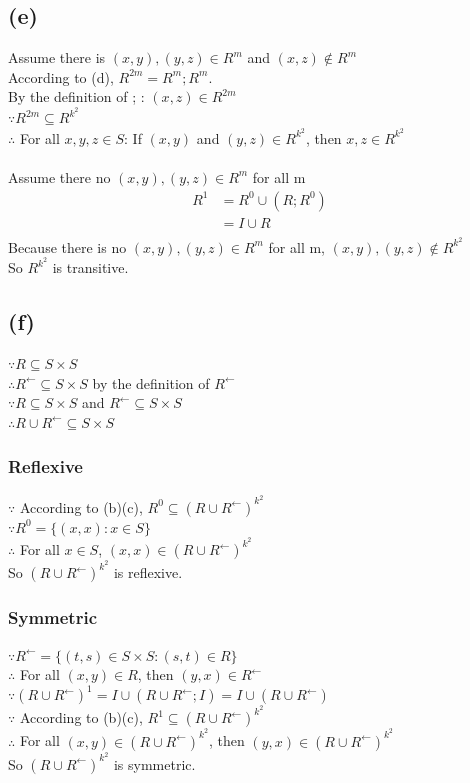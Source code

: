 \documentclass{article} %
\begin{document}
\subsection*{(e)}
Assume there is $(x, y), (y, z)\in R^m$ and $(x, z) \notin R^m$\\
According to (d), $R^{2m} = R^m;R^m$.\\
By the definition of ; : $(x, z) \in R^{2m}$\\
$\because R^{2m}\subseteq R^{k^2}$\\
$\therefore$ For all $x, y, z \in S$: If $(x, y)$ and $(y, z)\in R^{k^2}$, then ${x, z}\in R^{k^2}$\\
\\
Assume there no $(x, y), (y, z)\in R^m$ for all m\\
\[\begin{array}{rlcr}
    R^1 &= R^0 \cup (R;R^0)\\
        &= I \cup R\\
\end{array}\]
Because there is no $(x, y), (y, z)\in R^m$ for all m, $(x, y), (y, z) \notin R^{k^2}$\\

So $R^{k^2}$ is transitive.\\

\subsection*{(f)}
$\because R \subseteq S\times S$ \\
$\therefore R^{\gets} \subseteq S \times S$ by the definition of $R^{\gets}$\\
$\because R \subseteq S\times S$ and $R^{\gets} \subseteq S \times S$\\
$\therefore R\cup R^{\gets} \subseteq S \times S$\\
\subsubsection*{Reflexive}
$\because$ According to (b)(c), $R^0 \subseteq (R\cup R^{\gets})^{k^2}$\\
$\because R^0 = \{(x, x) : x \in S\}$ \\
$\therefore$ For all $x\in S$, $(x, x)\in (R\cup R^{\gets})^{k^2}$\\
So $(R\cup R^{\gets})^{k^2}$ is reflexive.\\
\subsubsection*{Symmetric}
$\because R^{\gets}=\{(t,s) \in S \times S : (s,t) \in R\}$\\
$\therefore$ For all $(x, y)\in R$, then  $(y, x)\in R^{\gets}$\\
$\because (R \cup R^{\gets})^1 = I \cup (R \cup R^{\gets};I) =I \cup (R \cup R^{\gets})$\\
$\because$ According to (b)(c), $R^1 \subseteq (R\cup R^{\gets})^{k^2}$\\
$\therefore$ For all $(x, y)\in (R\cup R^{\gets})^{k^2}$, then  $(y, x)\in (R\cup R^{\gets})^{k^2}$\\
So $(R\cup R^{\gets})^{k^2}$ is symmetric.
\end{document}
